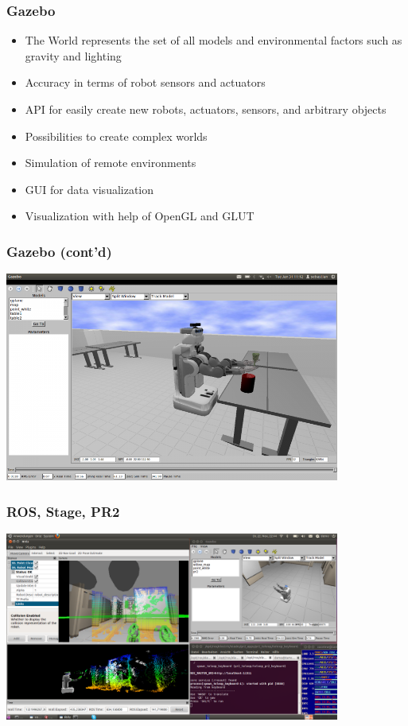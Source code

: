 \begin{frame}
  \frametitle{Gazebo}
\begin{itemize}
    \item The World represents the set of all models and environmental factors such as gravity and lighting
    \item Accuracy in terms of robot sensors and actuators
    \item API for easily create new robots, actuators, sensors, and arbitrary objects
    \item Possibilities to create complex worlds
    \item Simulation of remote environments
    \item GUI for data visualization
    \item Visualization with help of OpenGL and GLUT
    
\end{itemize}
\end{frame}

\begin{frame}
  \frametitle{Gazebo (cont'd)}
\includegraphics[width=11cm]{images/PR2_table.png}
\end{frame}




\begin{frame}
  \frametitle{ROS, Stage, PR2}
\includegraphics[width=11cm]{images/race_pr2_ros_rviz2.png}
\end{frame}
